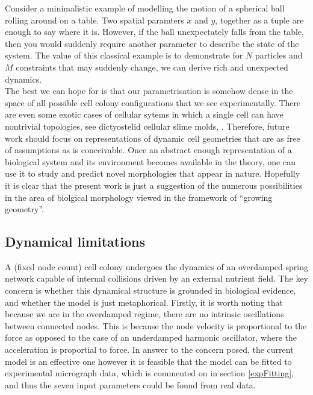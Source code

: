 Consider a minimalistic example of modelling the motion of a spherical ball rolling around on a table.
Two spatial paramters $x$ and $y$, together as a tuple are enough to say where it is. However, 
if the ball unexpectately falls from the table, then you would suddenly require
another parameter to describe the state of the system. The value of this classical example
is to demonstrate for $N$ particles and $M$ constraints that may suddenly change, 
we can derive rich and unexpected dynamics.
\\

The best we can hope for is that our parametrisation is somehow dense in the space
of all possible cell colony configurations that we see experimentally. There are even
some exotic cases of cellular sytems in which a single cell can have nontrivial topologies, 
see dictyostelid cellular slime molds, \cite{glockner2016multicellularity}. Therefore, future work 
should focus on representations of dynamic cell geometries that are as free of assumptions as
is conceivable. Once an abstract enough representation of a biological system and its environment
becomes available in the theory, one can use it to study and predict novel morphologies that appear 
in nature. Hopefully it is clear that the present work is just a suggestion of the numerous possibilities
in the area of biolgical morphology viewed in the framework of ``growing geometry''.

\subsection{Dynamical limitations}
A (fixed node count) cell colony undergoes the dynamics of an overdamped spring network capable
of internal collisions driven by
an external nutrient field. The key concern is whether this dynamical structure is grounded in 
biological evidence, and whether the model is just metaphorical. Firstly, 
it is worth noting that because we are in the overdamped regime,
there are no intrinsic oscillations between connected nodes. This is because the node velocity 
is proportional to the force as opposed to the case 
of an underdamped harmonic oscillator, where the acceleration is proportial to force.
In answer to the concern posed, the current model is an effective one however
it is feasible that the model can be fitted to experimental micrograph data, 
which is commented on in section \ref{expFitting}, and thus the seven input parameters 
could be found from real data.
\\

